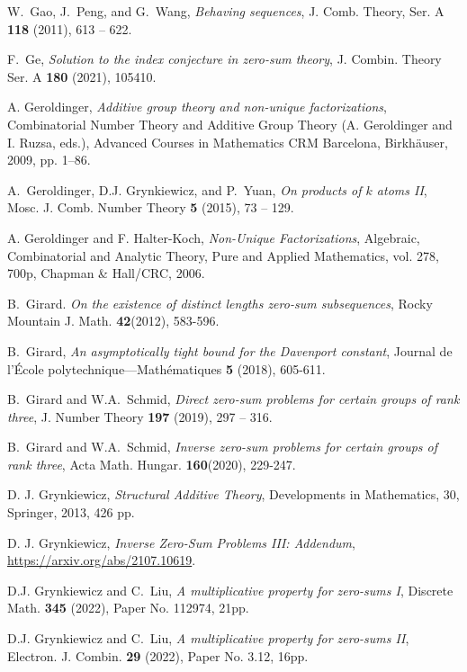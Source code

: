 \documentclass[11pt]{amsart}
\theoremstyle{definition}
\numberwithin{equation}{section}
\begin{document}
\begin{thebibliography}{99}
W.~Gao, J.~Peng, and G.~Wang, \emph{Behaving sequences}, J. Comb. Theory, Ser.
A \textbf{118} (2011), 613 -- 622.

F.~Ge, \emph{Solution to the index conjecture in zero-sum theory}, J. Combin.
Theory Ser. A \textbf{180} (2021), 105410.


A. Geroldinger, \emph{Additive group theory and non-unique factorizations},
Combinatorial {N}umber {T}heory and {A}dditive {G}roup {T}heory
(A. Geroldinger and I. Ruzsa, eds.), Advanced Courses in Mathematics CRM
Barcelona, Birkh{\"a}user, 2009, pp. 1--86.

A.~Geroldinger, D.J. Grynkiewicz, and P.~Yuan, \emph{On products of $k$ atoms
	{II}}, Mosc. J. Comb. Number Theory \textbf{5} (2015), 73 -- 129.


 A. Geroldinger and F. Halter-Koch, \emph{Non-Unique Factorizations}, Algebraic, Combinatorial and Analytic Theory, Pure
and Applied Mathematics, vol. 278, 700p, Chapman \& Hall/CRC, 2006.

B.~Girard.
\emph{On the existence of distinct lengths zero-sum subsequences},
 Rocky Mountain J. Math.  \textbf{42}(2012), 583-596.

B.~Girard,  \emph{An asymptotically tight bound for the Davenport constant}, Journal de l’École polytechnique—Mathématiques \textbf{5} (2018), 605-611.

B.~Girard and W.A.~Schmid, \emph{Direct zero-sum problems for certain groups of rank three}, J. Number Theory \textbf{197} (2019), 297 -- 316.


B.~Girard and W.A.~Schmid, \emph{Inverse zero-sum problems for certain groups of rank three}, Acta Math. Hungar. \textbf{160}(2020), 229-247.


 D. J. Grynkiewicz, \emph{Structural Additive Theory},
Developments in Mathematics, 30, Springer, 2013, 426 pp.

 D. J. Grynkiewicz, \emph{Inverse Zero-Sum Problems III: Addendum},
 \href{arxiv}{https://arxiv.org/abs/2107.10619}.



D.J. Grynkiewicz and C.~Liu, \emph{A multiplicative property for zero-sums
	{I}}, Discrete Math. \textbf{345} (2022), Paper No. 112974, 21pp.

D.J. Grynkiewicz and C.~Liu, \emph{A multiplicative property for zero-sums {II}}, Electron. J.
Combin. \textbf{29} (2022), {Paper No. 3.12, 16pp.}



\end{thebibliography}
\end{document}
